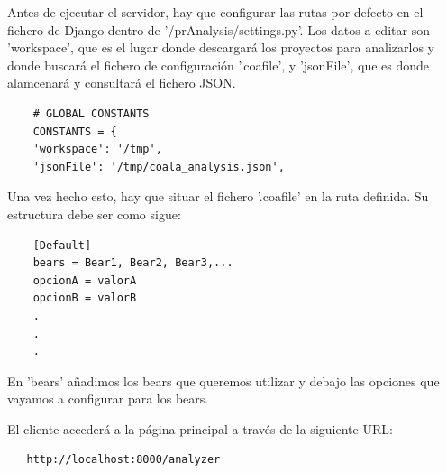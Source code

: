 \documentclass[a4paper, 12pt]{book}
\begin{document}
Antes de ejecutar el servidor, hay que configurar las rutas por defecto en el fichero de Django dentro de '/prAnalysis/settings.py'. Los datos a editar son 'workspace', que es el lugar donde descargará los proyectos para analizarlos y donde buscará el fichero de configuración '.coafile', y 'jsonFile', que es donde alamcenará y consultará el fichero JSON.
{\footnotesize
\begin{verbatim}
    # GLOBAL CONSTANTS
    CONSTANTS = {
    'workspace': '/tmp',
    'jsonFile': '/tmp/coala_analysis.json',
\end{verbatim}
}
Una vez hecho esto, hay que situar el fichero '.coafile' en la ruta definida. Su estructura debe ser como sigue:
{\footnotesize
\begin{verbatim}
    [Default]
    bears = Bear1, Bear2, Bear3,...
    opcionA = valorA
    opcionB = valorB
    .
    .
    .
\end{verbatim}
}

En 'bears' añadimos los bears que queremos utilizar y debajo las opciones que vayamos a configurar para los bears.

El cliente accederá a la página principal a través de la siguiente URL:
{\footnotesize
\begin{verbatim}
   http://localhost:8000/analyzer
\end{verbatim}
}



\cleardoublepage


\end{document}
